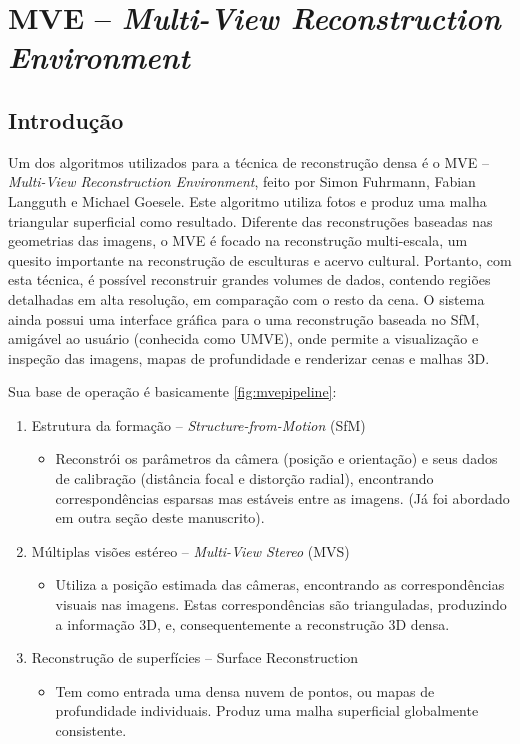 \section{MVE -- \textit{Multi-View Reconstruction Environment}}\label{sec:mve}
%
\subsection{Introdução}
Um dos algoritmos utilizados para a técnica de reconstrução densa é o MVE -- {\it Multi-View Reconstruction Environment}, feito por Simon Fuhrmann, Fabian Langguth e Michael Goesele. Este algoritmo utiliza fotos e produz uma malha triangular superficial como resultado. Diferente das reconstruções baseadas nas geometrias das imagens, o MVE é focado na reconstrução multi-escala, um quesito importante na reconstrução de esculturas e acervo cultural. Portanto, com esta técnica, é possível reconstruir grandes volumes de dados, contendo regiões detalhadas em alta resolução, em comparação com o resto da cena. O sistema ainda possui uma interface gráfica para o uma reconstrução baseada no SfM, amigável ao usuário (conhecida como UMVE), onde permite a visualização e inspeção das imagens, mapas de profundidade e renderizar cenas e malhas 3D.

Sua base de operação é basicamente \ref{fig:mvepipeline}:

\begin{enumerate}
\item{Estrutura da formação -- {\it Structure-from-Motion} (SfM)}

\begin{itemize}
\item{
Reconstrói os parâmetros da câmera (posição e orientação) e seus dados de calibração (distância focal e distorção radial),
encontrando correspondências esparsas mas estáveis entre as imagens. (Já foi abordado em outra seção deste manuscrito).
}
\end{itemize}

\item{Múltiplas visões estéreo -- {\it Multi-View Stereo} (MVS)}
\begin{itemize}
\item{
Utiliza a posição estimada das câmeras, encontrando as correspondências visuais nas imagens. Estas correspondências são trianguladas, produzindo a informação 3D, e,
consequentemente a reconstrução 3D densa.
} 
\end{itemize}
\item{Reconstrução de superfícies -- {Surface Reconstruction}}
\begin{itemize}
\item{
Tem como entrada uma densa nuvem de pontos, ou mapas de profundidade individuais. Produz uma malha superficial globalmente consistente.
}
\end{itemize}
\end{enumerate}

